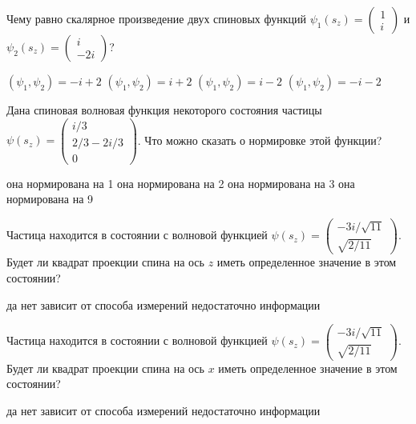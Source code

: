 \documentclass[11pt,a4paper]{exam}
\begin{document}
\begin{questions}
\question Чему равно скалярное произведение двух спиновых функций ${\psi _1}({s_z}) = \left( {\begin{array}{*{20}{c}}
1\\
i
\end{array}} \right)$ и ${\psi _2}({s_z}) = \left( {\begin{array}{*{20}{c}}
i\\
{ - 2i}
\end{array}} \right)$?
\begin{choices}
\choice $\left( {{\psi _1},{\psi _2}} \right) =  - i + 2$  
\choice $\left( {{\psi _1},{\psi _2}} \right) = i + 2$  
\choice $\left( {{\psi _1},{\psi _2}} \right) = i - 2$  
\choice $\left( {{\psi _1},{\psi _2}} \right) =  - i - 2$
\end{choices}

\question Дана спиновая волновая функция некоторого состояния частицы
$\psi \left( {{s_z}} \right) = \left( {\begin{array}{*{20}{c}}
{i/3}\\
{2/3 - 2i/3}\\
0
\end{array}} \right)$. Что можно сказать о нормировке этой функции?
\begin{choices}
\choice она нормирована на 1    
\choice она нормирована на 2
\choice она нормирована на 3    
\choice она нормирована на 9
\end{choices}

\question Частица находится в состоянии с волновой функцией $\psi ({s_z}) = \left( {\begin{array}{*{20}{c}}
{ - 3i/\sqrt {11} }\\
{\sqrt {2/11} }
\end{array}} \right)$. Будет ли квадрат проекции спина на ось $z$ иметь определенное значение в этом состоянии?
\begin{choices}
\choice да                
\choice нет
\choice зависит от способа измерений     
\choice недостаточно информации
\end{choices}

\question Частица находится в состоянии с волновой функцией $\psi ({s_z}) = \left( {\begin{array}{*{20}{c}}
{ - 3i/\sqrt {11} }\\
{\sqrt {2/11} }
\end{array}} \right)$. Будет ли квадрат проекции спина на ось $x$ иметь определенное значение в этом состоянии?
\begin{choices}
\choice да                
\choice нет
\choice зависит от способа измерений     
\choice недостаточно информации
\end{choices}


\end{questions}
\end{document}
